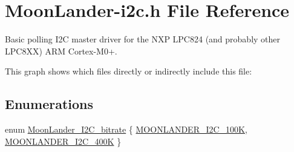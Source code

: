 \hypertarget{MoonLander-i2c_8h}{}\section{Moon\+Lander-\/i2c.h File Reference}
\label{MoonLander-i2c_8h}


Basic polling I2C master driver for the N\+XP L\+P\+C824 (and probably other L\+P\+C8\+XX) A\+RM Cortex-\/\+M0+.  


This graph shows which files directly or indirectly include this file\+:
\subsection*{Enumerations}
\begin{DoxyCompactItemize}
\item 
enum \hyperlink{MoonLander-i2c_8h_a99b692076d07b714e6b130bdc715e3ee}{Moon\+Lander\+\_\+\+I2\+C\+\_\+bitrate} \{ \hyperlink{MoonLander-i2c_8h_a99b692076d07b714e6b130bdc715e3eea9a053bd0e23847d1237ee0dfbd0af724}{M\+O\+O\+N\+L\+A\+N\+D\+E\+R\+\_\+\+I2\+C\+\_\+100K}, 
\hyperlink{MoonLander-i2c_8h_a99b692076d07b714e6b130bdc715e3eeabb3ce3f508f70b572e65570bec3688d5}{M\+O\+O\+N\+L\+A\+N\+D\+E\+R\+\_\+\+I2\+C\+\_\+400K}
 \}
\end{DoxyCompactItemize}
